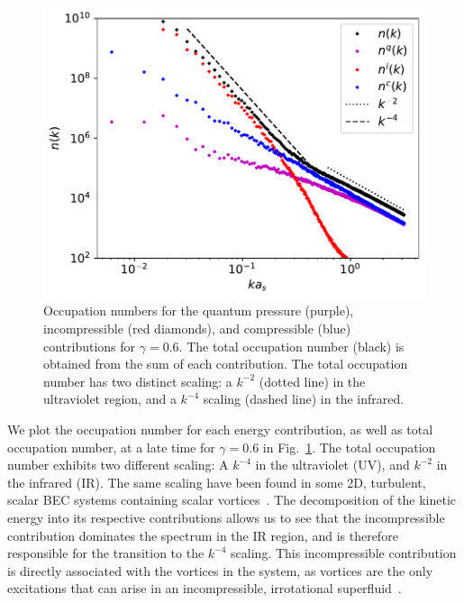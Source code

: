 \begin{figure}[t!]
    \centering
    \includegraphics[scale=0.75]{gfx/ch-twoCompDynamics/spectra.pdf}
    \caption[Occupation numbers for quantum pressure, incompressible and
        compressible contributions]
    {Occupation numbers for the quantum pressure (purple),
        incompressible (red diamonds), and compressible (blue)
        contributions for \(\gamma=0.6\).
        The total occupation number (black) is obtained from the sum of
        each contribution.
        The total occupation number has two distinct scaling: a \(k^{-2}\)
        (dotted line) in the ultraviolet region, and a \(k^{-4}\) scaling
        (dashed line) in the infrared.\label{fig:kinetic-energy-spectra}}
\end{figure}
We plot the occupation number for each energy contribution, as well as total
occupation number, at a late time for \(\gamma=0.6\) in
Fig.~\ref{fig:kinetic-energy-spectra}.
The total occupation number exhibits two different scaling: A \(k^{-4}\) in the
ultraviolet (UV), and \(k^{-2}\) in the infrared (IR).
The same scaling have been found in some 2D, turbulent, scalar BEC systems
containing scalar vortices~\cite{Nowak2012}.
The decomposition of the kinetic energy into its respective contributions
allows us to see that the incompressible contribution dominates the spectrum
in the IR region, and is therefore responsible for the transition to the
\(k^{-4}\) scaling.
This incompressible contribution is directly associated with the vortices in
the system, as vortices are the only excitations that can arise in an
incompressible, irrotational superfluid~\cite{Pethick2008,Barenghi2016}.
